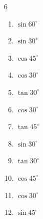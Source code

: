 \begin{multicols}{6}
\begin{enumerate}

  \item $\displaystyle \sin{60^\circ}$


\columnbreak %

  \item $\displaystyle \sin{30^\circ}$


  \item $\displaystyle \cos{45^\circ}$


  \item $\displaystyle \cos{30^\circ}$


  \item $\displaystyle \tan{30^\circ}$


  \item $\displaystyle \cos{30^\circ}$


  \item $\displaystyle \tan{45^\circ}$

        \phantom{$\displaystyle =1$}

  \item $\displaystyle \sin{30^\circ}$


  \item $\displaystyle \tan{30^\circ}$


  \item $\displaystyle \cos{45^\circ}$


  \item $\displaystyle \cos{30^\circ}$


  \item $\displaystyle \sin{45^\circ}$


\end{enumerate}
\end{multicols}
